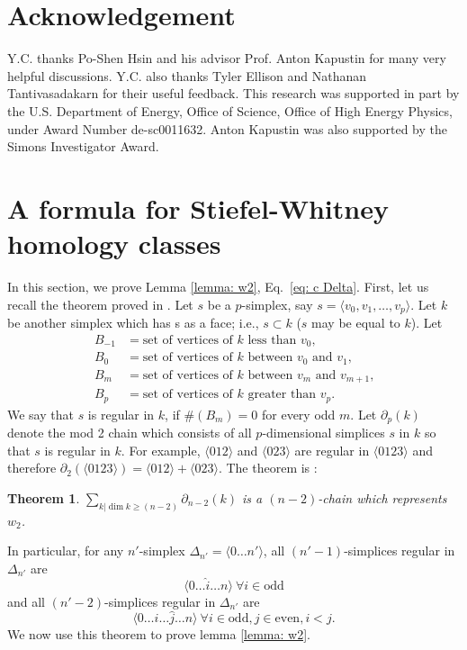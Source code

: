\documentclass[12pt]{article}
\newtheorem{theorem}{Theorem}
\begin{document}
\section*{Acknowledgement}
Y.C. thanks Po-Shen Hsin and his advisor Prof. Anton Kapustin for many very helpful discussions. Y.C. also thanks Tyler Ellison and Nathanan Tantivasadakarn for their useful feedback. This research was supported in part by the U.S. Department of Energy, Office of Science, Office of High Energy Physics, under Award Number de-sc0011632. Anton Kapustin was also supported by the Simons Investigator Award.

\appendix

\section{A formula for Stiefel-Whitney homology classes} \label{sec: formula for Stiefel-Whitney homology classes}

In this section, we prove Lemma \ref{lemma: w2}, Eq.~\eqref{eq: c Delta}.
First, let us recall the theorem proved in \cite{GT76}.
Let $s$ be a $p$-simplex, say $s = \langle v_0, v_1,\dots, v_p \rangle$. Let $k$ be another simplex which has s as a face; i.e., $s \subset k$ ($s$ may be equal to $k$). Let
\begin{equation}
    \begin{split}
        B_{-1} &= \text{set of vertices of $k$ less than $v_0$,}\\
        B_{0} &= \text{set of vertices of $k$ between $v_0$ and $v_1$,} \\
        B_{m} &= \text{set of vertices of $k$ between $v_m$ and $v_{m+1}$,} \\
        B_{p} &= \text{set of vertices of $k$ greater than $v_p$.} 
    \end{split}
\end{equation}
We say that $s$ is regular in $k$, if $ \# (B_m) = 0$ for every odd $m$. Let $\partial_p (k)$ denote the mod 2 chain which consists of all $p$-dimensional simplices $s$ in $k$ so that $s$ is regular in $k$. For example, $\langle 012 \rangle$ and $\langle 023 \rangle$ are regular in $\langle 0123 \rangle$ and therefore $\partial_2 (\langle 0123 \rangle) = \langle 012 \rangle + \langle 023 \rangle$. The theorem is \cite{GT76}:
\begin{theorem}
    $\sum_{k| \dim k \geq {(n-2)} } \partial_{n-2}(k)$ is a $(n-2)$-chain which represents $w_2$.
\label{eq: theorem}
\end{theorem}
In particular, for any $n'$-simplex $\Delta_{n'} = \langle 0 \dots n' \rangle$, all $(n'-1)$-simplices regular in $\Delta_{n'}$ are
\begin{equation}
    \langle 0 \dots \hat{i} \dots n \rangle ~\forall i \in \text{odd}
\end{equation}
and all $(n'-2)$-simplices regular in $\Delta_{n'}$ are
\begin{equation}
    \langle 0 \dots \hat{i} \dots \hat{j} \dots n \rangle ~\forall i \in \text{odd}, j \in \text{even}, i<j.
\end{equation}
We now use this theorem to prove lemma \ref{lemma: w2}.
\end{document}
